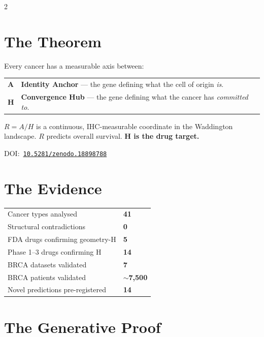 \documentclass[9.5pt, a4paper]{article}
\begin{document}
\begin{multicols}{2}


\section{The Theorem}

Every cancer has a measurable axis between:

\smallskip
{\small
\begin{tabular}{p{0.55cm}p{5.5cm}}
\textbf{A} &
\textbf{Identity Anchor} — the gene defining
what the cell of origin \textit{is}. \\[0.2em]
\textbf{H} &
\textbf{Convergence Hub} — the gene defining
what the cancer has \textit{committed to}. \\
\end{tabular}
}

\smallskip
{\small
$R = A/H$ is a continuous, IHC-measurable
coordinate in the Waddington landscape.
$R$ predicts overall survival.
\textbf{H is the drug target.}
}

{\footnotesize
DOI:\
\href{https://doi.org/10.5281/zenodo.18898788}
{\texttt{10.5281/zenodo.18898788}}
}

\section{The Evidence}

{\small
\begin{tabular}{p{4.0cm}p{1.8cm}}
Cancer types analysed & \textbf{41} \\
Structural contradictions & \textbf{0} \\
FDA drugs confirming geometry-H & \textbf{5} \\
Phase 1--3 drugs confirming H & \textbf{14} \\
BRCA datasets validated & \textbf{7} \\
BRCA patients validated & \textbf{$\sim$7,500} \\
Novel predictions pre-registered & \textbf{14} \\
\end{tabular}
}

\section{The Generative Proof}


\end{multicols}
\end{document}
